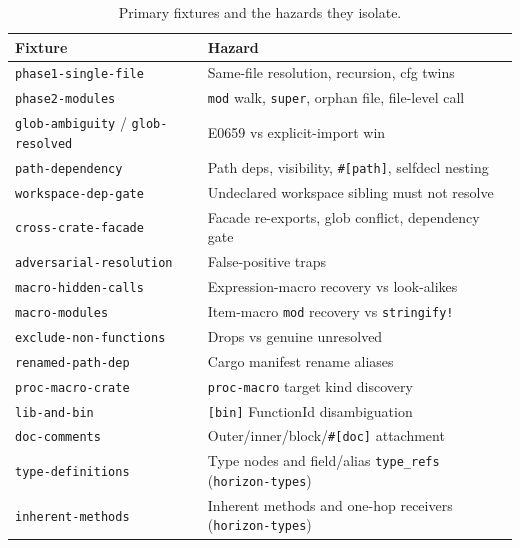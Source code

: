 \documentclass[11pt,a4paper,oneside]{report}
\begin{document}
\begin{table}[ht]
\centering
\small
\begin{tabular}{@{}lp{8cm}@{}}
\toprule
\textbf{Fixture} & \textbf{Hazard} \\
\midrule
\texttt{phase1-single-file} & Same-file resolution, recursion, cfg twins \\
\texttt{phase2-modules} & \texttt{mod} walk, \texttt{super}, orphan file, file-level call \\
\texttt{glob-ambiguity} / \texttt{glob-resolved} & E0659 vs explicit-import win \\
\texttt{path-dependency} & Path deps, visibility, \texttt{\#[path]}, selfdecl nesting \\
\texttt{workspace-dep-gate} & Undeclared workspace sibling must not resolve \\
\texttt{cross-crate-facade} & Facade re-exports, glob conflict, dependency gate \\
\texttt{adversarial-resolution} & False-positive traps \\
\texttt{macro-hidden-calls} & Expression-macro recovery vs look-alikes \\
\texttt{macro-modules} & Item-macro \texttt{mod} recovery vs \texttt{stringify!} \\
\texttt{exclude-non-functions} & Drops vs genuine unresolved \\
\texttt{renamed-path-dep} & Cargo manifest rename aliases \\
\texttt{proc-macro-crate} & \texttt{proc-macro} target kind discovery \\
\texttt{lib-and-bin} & \texttt{[bin]} FunctionId disambiguation \\
\texttt{doc-comments} & Outer/inner/block/\texttt{\#[doc]} attachment \\
\texttt{type-definitions} & Type nodes and field/alias \texttt{type\_refs} (\texttt{horizon-types}) \\
\texttt{inherent-methods} & Inherent methods and one-hop receivers (\texttt{horizon-types}) \\
\bottomrule
\end{tabular}
\caption{Primary fixtures and the hazards they isolate.}
\label{tab:fixtures}
\end{table}
\end{document}
